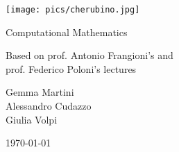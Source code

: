 \documentclass[preview,12pt]{article}
\begin{document}
\begin{titlepage}
\begin{center}
\vspace{3cm}

\Large

\vspace{2cm}

\texttt{[image: pics/cherubino.jpg]}

\vspace{2.5cm}

{\Huge \sc Computational Mathematics}

\vspace{2cm}
Based on prof. Antonio Frangioni's and\\
  prof. Federico Poloni's lectures

\vspace{2cm}
Gemma Martini\\ Alessandro Cudazzo\\ Giulia Volpi
\vfill

\today

\end{center}
\end{titlepage}


\tableofcontents
\let\tableofcontents\relax

\newpage



\newpage



\newpage



\newpage



\newpage



\newpage




\newpage



\newpage



\newpage



\newpage


\end{document}
